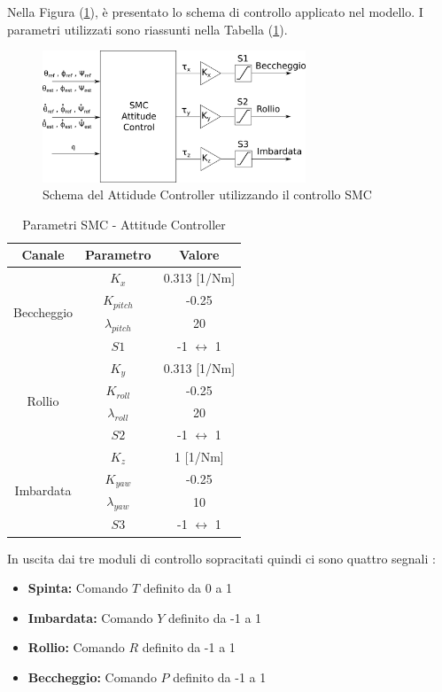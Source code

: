 Nella Figura (\ref{fig:SMC_ATT}), è presentato lo schema di controllo applicato nel modello. I parametri utilizzati sono riassunti nella Tabella (\ref{tab:ab:SMC_ATT}).

\begin{figure}
	\centering
	\includegraphics[width=0.7\textwidth]{SistemaQuadrirotore/Figure/SMCAttitudeCtrl}
	\caption{Schema del Attidude Controller utilizzando il controllo SMC}
	\label{fig:SMC_ATT}
\end{figure}

\begin{table}
	\centering
	\begin{tabular}{c c c}
		\hline
		Canale  & Parametro & Valore \\
		\hline
		\multirow{4}{*}{Beccheggio}&$K_x$ & 0.313 [1/Nm]\\
		&$K_{pitch}$ & -0.25\\
		&$\lambda_{pitch}$ & 20\\
		&$S1$ & -1 $\leftrightarrow$ 1\\
		\hline
		\multirow{4}{*}{Rollio}&$K_y$ & 0.313 [1/Nm]\\
		&$K_{roll}$ & -0.25\\
		&$\lambda_{roll}$ & 20\\
		&$S2$ & -1 $\leftrightarrow$ 1\\
		\hline
		\multirow{4}{*}{Imbardata}&$K_z$ & 1 [1/Nm]\\
		&$K_{yaw}$ & -0.25\\
		&$\lambda_{yaw}$ & 10\\
		&$S3$ & -1 $\leftrightarrow$ 1\\
		\hline
	\end{tabular}	
	\caption{Parametri SMC - Attitude Controller}
	\label{tab:ab:SMC_ATT}
\end{table}
\clearpage
In uscita dai tre moduli di controllo sopracitati quindi ci sono quattro segnali :
\begin{itemize}
	\item \textbf{Spinta:} Comando $T$ definito da 0 a 1
	\item \textbf{Imbardata:} Comando $Y$ definito da -1 a 1
	\item \textbf{Rollio:} Comando $R$ definito da -1 a 1
	\item \textbf{Beccheggio:} Comando $P$ definito da -1 a 1
\end{itemize}

